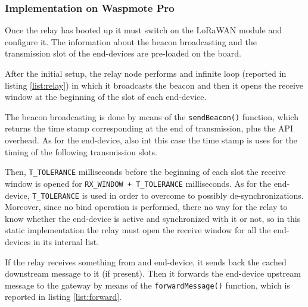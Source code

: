 \subsubsection{Implementation on Waspmote Pro}
Once the relay has booted up it must switch on the LoRaWAN module and configure it. The information about the beacon broadcasting and the transmission slot of the end-devices are pre-loaded on the board.

After the initial setup, the relay node performs and infinite loop (reported in listing \ref{list:relay}) in which it broadcasts the beacon and then it opens the receive window at the beginning of the slot of each end-device. 

The beacon broadcasting is done by means of the \texttt{sendBeacon()} function, which returns the time stamp corresponding at the end of transmission, plus the API overhead. As for the end-device, also int this case the time stamp is uses for the timing of the following transmission slots.

Then, \texttt{T\_TOLERANCE} milliseconds before the beginning of each slot the receive window is opened for \texttt{RX\_WINDOW + T\_TOLERANCE} milliseconds. As for the end-device, \texttt{T\_TOLERANCE} is used in order to overcome to possibly de-synchronizations. Moreover, since no bind operation is performed, there no way for the relay to know whether the end-device is active and synchronized with it or not, so in this static implementation the relay must open the receive window for all the end-devices in its internal list.

If the relay receives something from and end-device, it sends back the cached downstream message to it (if present). Then it forwards the end-device upstream message to the gateway by means of the \texttt{forwardMessage()} function, which is reported in listing \ref{list:forward}.


